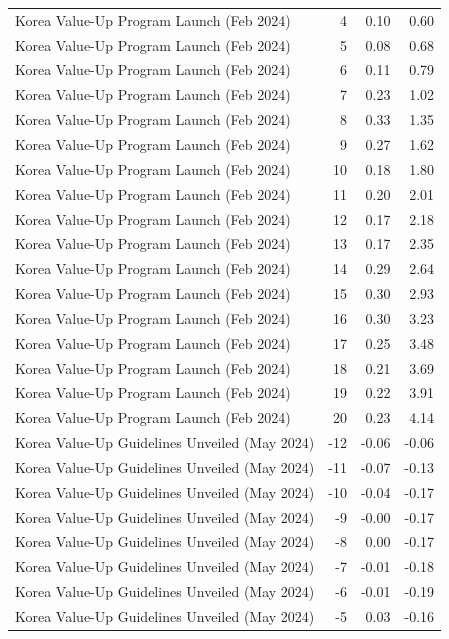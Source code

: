 \begin{table}
\begin{tabular}{lrrr}
Korea Value-Up Program Launch (Feb 2024) & 4 & 0.10 & 0.60 \\
Korea Value-Up Program Launch (Feb 2024) & 5 & 0.08 & 0.68 \\
Korea Value-Up Program Launch (Feb 2024) & 6 & 0.11 & 0.79 \\
Korea Value-Up Program Launch (Feb 2024) & 7 & 0.23 & 1.02 \\
Korea Value-Up Program Launch (Feb 2024) & 8 & 0.33 & 1.35 \\
Korea Value-Up Program Launch (Feb 2024) & 9 & 0.27 & 1.62 \\
Korea Value-Up Program Launch (Feb 2024) & 10 & 0.18 & 1.80 \\
Korea Value-Up Program Launch (Feb 2024) & 11 & 0.20 & 2.01 \\
Korea Value-Up Program Launch (Feb 2024) & 12 & 0.17 & 2.18 \\
Korea Value-Up Program Launch (Feb 2024) & 13 & 0.17 & 2.35 \\
Korea Value-Up Program Launch (Feb 2024) & 14 & 0.29 & 2.64 \\
Korea Value-Up Program Launch (Feb 2024) & 15 & 0.30 & 2.93 \\
Korea Value-Up Program Launch (Feb 2024) & 16 & 0.30 & 3.23 \\
Korea Value-Up Program Launch (Feb 2024) & 17 & 0.25 & 3.48 \\
Korea Value-Up Program Launch (Feb 2024) & 18 & 0.21 & 3.69 \\
Korea Value-Up Program Launch (Feb 2024) & 19 & 0.22 & 3.91 \\
Korea Value-Up Program Launch (Feb 2024) & 20 & 0.23 & 4.14 \\
Korea Value-Up Guidelines Unveiled (May 2024) & -12 & -0.06 & -0.06 \\
Korea Value-Up Guidelines Unveiled (May 2024) & -11 & -0.07 & -0.13 \\
Korea Value-Up Guidelines Unveiled (May 2024) & -10 & -0.04 & -0.17 \\
Korea Value-Up Guidelines Unveiled (May 2024) & -9 & -0.00 & -0.17 \\
Korea Value-Up Guidelines Unveiled (May 2024) & -8 & 0.00 & -0.17 \\
Korea Value-Up Guidelines Unveiled (May 2024) & -7 & -0.01 & -0.18 \\
Korea Value-Up Guidelines Unveiled (May 2024) & -6 & -0.01 & -0.19 \\
Korea Value-Up Guidelines Unveiled (May 2024) & -5 & 0.03 & -0.16 \\

\end{tabular}
\end{table}
